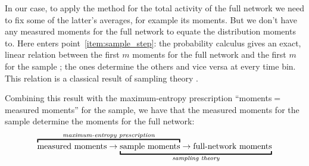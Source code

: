 \documentclass[\ifafour a4paper,12pt,\else a5paper,10pt,\fi%
onecolumn,oneside,article,%
british%
]{memoir}
\theoremstyle{remark}
\theoremstyle{innote}
\newcommand*{\citep}{\parencites}
\renewcommand*{\|}{\nonscript\,\vert\nonscript\;\mathopen{}}
\newcommand*{\chap}{ch.}%
\newcommand*{\chaps}{chs}%
\newcommand*{\eqns}{eqs}%
\begin{document}
In our case, to apply the method for the total activity of the full network
we need to fix some of the latter's averages, for example its moments. But
we don't have any measured moments for the full network to equate the
distribution moments to. Here enters point~\ref{item:sample_step}: the
probability calculus gives an exact, linear relation between the first $m$
moments for the full network and the first $m$ for the sample
\citep[\eqns~(16)]{portamanaetal2015}; the ones determine the others and
vice versa at every time bin. This relation is a classical result of
sampling theory
\citep[\chaps~I--IV]{whitworth1867_r1965}[\chap~II]{feller1950_r1968}[\chap~3]{jaynes1994_r2003}[see
also][]{whitworth1897}.

Combining this result with the maximum-entropy prescription
\enquote{moments${}={}$measured moments} for the sample, we have that the
measured moments for the sample determine the moments for the full network:
\begin{equation*}
  \label{eq:chain_prescription_moments}
  \mathrlap{\overbracket{\phantom{\text{measured moments} \rightarrow
        \text{sample moments}}}^{\textit{maximum-entropy prescription}}}
  \text{measured moments} \rightarrow
        \underbracket{\text{sample moments}
  \rightarrow
    \text{full-network moments}}_{\textit{sampling theory}}
\end{equation*}
\end{document}
